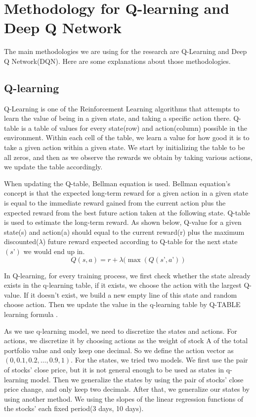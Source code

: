 \chapter{Methodology for Q-learning and Deep Q Network}
\label{Ch:methodology}

The main methodologies we are using for the research are Q-Learning and Deep Q Network(DQN). Here are some explanations about those methodologies.

\section{Q-learning}
Q-Learning is one of the Reinforcement Learning algorithms that attempts to learn the value of being in a given state, and taking a specific action there. Q-table is a table of values for every state(row) and action(column) possible in the environment. Within each cell of the table, we learn a value for how good it is to take a given action within a given state.  We start by initializing the table to be all zeros, and then as we observe the rewards we obtain by taking various actions, we update the table accordingly.

When updating the Q-table, Bellman equation is used. Bellman equation’s concept is that the expected long-term reward for a given action in a given state is equal to the immediate reward gained from the current action plus the expected reward from the best future action taken at the following state. Q-table is used to estimate the long-term reward. As shown below, Q-value for a given state(s) and action(a) should equal to the current reward(r) plus the maximum discounted($\lambda$) future reward expected according to Q-table for the next state$(s’)$ we would end up in. 
$$Q(s,a) = r + \lambda (\max (Q(s’,a’))$$

In Q-learning, for every training process, we first check whether the state already exists in the q-learning table, if it exists, we choose the action with the largest Q-value. If it doesn’t exist, we build a new empty line of this state and random choose action. Then we update the value in the q-learning table by  Q-TABLE learning formula .

As we use q-learning model, we need to discretize the states and actions. For actions, we discretize it by choosing actions as the weight of stock A of the total portfolio value and only keep one decimal. So we define the action vector as $(0, 0.1, 0.2, …, 0.9, 1)$. For the states, we tried two models. We first use the pair of stocks’ close price, but it is not general enough to be used as states in q-learning model. Then we generalize the states by using the pair of stocks’ close price change, and only keep two decimals. After that, we generalize our states by using another method. We using the slopes of the linear regression functions of the stocks’ each fixed period(3 days, 10 days).

